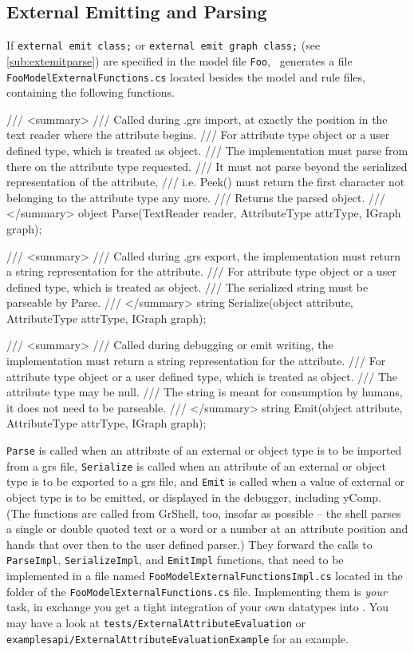 \subsection*{External Emitting and Parsing}\label{sub:apiextemitparse}
If \texttt{external emit class;} or \texttt{external emit graph class;} (see \ref{sub:extemitparse}) are specified in the model file \texttt{Foo}, \GrG~generates a file \texttt{FooModelExternalFunctions.cs} located besides the model and rule files,
containing the following functions.

\begin{csharplet}
/// <summary>
/// Called during .grs import, at exactly the position in the text reader where the attribute begins.
/// For attribute type object or a user defined type, which is treated as object.
/// The implementation must parse from there on the attribute type requested.
/// It must not parse beyond the serialized representation of the attribute, 
/// i.e. Peek() must return the first character not belonging to the attribute type any more.
/// Returns the parsed object.
/// </summary>
object Parse(TextReader reader, AttributeType attrType, IGraph graph);

/// <summary>
/// Called during .grs export, the implementation must return a string representation for the attribute.
/// For attribute type object or a user defined type, which is treated as object.
/// The serialized string must be parseable by Parse.
/// </summary>
string Serialize(object attribute, AttributeType attrType, IGraph graph);

/// <summary>
/// Called during debugging or emit writing, the implementation must return a string representation for the attribute.
/// For attribute type object or a user defined type, which is treated as object.
/// The attribute type may be null.
/// The string is meant for consumption by humans, it does not need to be parseable.
/// </summary>
string Emit(object attribute, AttributeType attrType, IGraph graph);
\end{csharplet}

\texttt{Parse} is called when an attribute of an external or object type is to be imported from a grs file, \texttt{Serialize} is called when an attribute of an external or object type is to be exported to a grs file, and \texttt{Emit} is called when a value of external or object type is to be emitted, or displayed in the debugger, including yComp.
(The functions are called from GrShell, too, insofar as possible -- the shell parses a single or double quoted text or a word or a number at an attribute position and hands that over then to the user defined parser.)
They forward the calls to \texttt{ParseImpl}, \texttt{SerializeImpl}, and \texttt{EmitImpl} functions, that need to be implemented in a file named \texttt{FooModelExternal\-FunctionsImpl.cs} located in the folder of the \texttt{FooModelExternalFunctions.cs} file.
Implementing them is \emph{your} task, in exchange you get a tight integration of your own datatypes into \GrG.
You may have a look at \texttt{tests/ExternalAttributeEvaluation} or \texttt{examples\-api/ExternalAttributeEvaluationExample} for an example.

